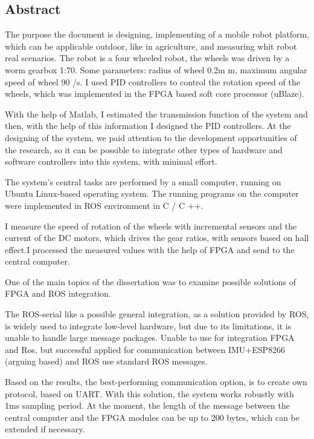 \begin{titlepage}

\section*{Abstract}

The purpose the document is designing, implementing of a mobile robot platform, which can be applicable outdoor, like in agriculture, and measuring whit robot real scenarios. The robot is a four wheeled robot, the wheels was driven by a worm gearbox 1:70. Some parameters: radius of wheel 0.2m m, maximum angular speed of wheel 90 \degree/s. 
I used PID controllers to control the rotation speed of the wheels, which was implemented in the FPGA based soft core processor (uBlaze). 

With the help of Matlab, I estimated the transmission function of the system and then, with the help of this information I designed the PID controllers.
At the designing of the system, we paid attention to the development opportunities of the research, so it can be possible to integrate other types of hardware and software controllers into this system, with minimal effort.

The system's central tasks are performed by a small computer, running on Ubuntu Linux-based operating system. The running programs on the computer were implemented in ROS environment in C / C ++.

I measure the speed of rotation of the wheels with incremental sensors and the current of the DC motors, which drives the gear ratios, with sensors based on hall effect.I processed the measured values with the help of FPGA and send to the central computer.

One of the main topics of the dissertation was to examine possible solutions of FPGA and ROS integration.

The ROS-serial like a possible general integration, as a solution provided by ROS, is widely used to integrate low-level hardware, but due to its limitations, it is unable to handle large message packages.  Unable to use for integration FPGA and Ros, but successful applied for communication between IMU+ESP8266 (arguing based) and ROS use standard ROS messages.


Based on the results, the best-performing communication option, is to create own protocol, based on UART. With this solution, the system works robustly with 1ms sampling period. At the moment, the length of the message between the central computer and the FPGA modules can be up to 200 bytes, which can be extended if necessary.


\end{titlepage}

